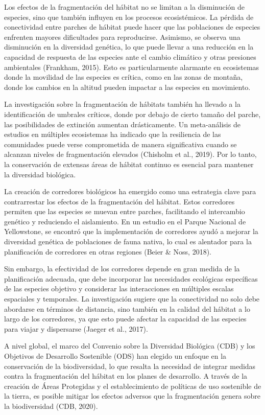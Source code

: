 \documentclass[
  letterpaper,
  DIV=11,
  numbers=noendperiod,
  oneside]{scrreprt}
\begin{document}
Los efectos de la fragmentación del hábitat no se limitan a la
disminución de especies, sino que también influyen en los procesos
ecosistémicos. La pérdida de conectividad entre parches de hábitat puede
hacer que las poblaciones de especies enfrenten mayores dificultades
para reproducirse. Asimismo, se observa una disminución en la diversidad
genética, lo que puede llevar a una reducción en la capacidad de
respuesta de las especies ante el cambio climático y otras presiones
ambientales (Frankham, 2015). Esto es particularmente alarmante en
ecosistemas donde la movilidad de las especies es crítica, como en las
zonas de montaña, donde los cambios en la altitud pueden impactar a las
especies en movimiento.

La investigación sobre la fragmentación de hábitats también ha llevado a
la identificación de umbrales críticos, donde por debajo de cierto
tamaño del parche, las posibilidades de extinción aumentan
drásticamente. Un meta-análisis de estudios en múltiples ecosistemas ha
indicado que la resiliencia de las comunidades puede verse comprometida
de manera significativa cuando se alcanzan niveles de fragmentación
elevados (Chisholm et al., 2019). Por lo tanto, la conservación de
extensas áreas de hábitat continuo es esencial para mantener la
diversidad biológica.

La creación de corredores biológicos ha emergido como una estrategia
clave para contrarrestar los efectos de la fragmentación del hábitat.
Estos corredores permiten que las especies se muevan entre parches,
facilitando el intercambio genético y reduciendo el aislamiento. En un
estudio en el Parque Nacional de Yellowstone, se encontró que la
implementación de corredores ayudó a mejorar la diversidad genética de
poblaciones de fauna nativa, lo cual es alentador para la planificación
de corredores en otras regiones (Beier \& Noss, 2018).

Sin embargo, la efectividad de los corredores depende en gran medida de
la planificación adecuada, que debe incorporar las necesidades
ecológicas específicas de las especies objetivo y considerar las
interacciones en múltiples escalas espaciales y temporales. La
investigación sugiere que la conectividad no solo debe abordarse en
términos de distancia, sino también en la calidad del hábitat a lo largo
de los corredores, ya que esto puede afectar la capacidad de las
especies para viajar y dispersarse (Jaeger et al., 2017).

A nivel global, el marco del Convenio sobre la Diversidad Biológica
(CDB) y los Objetivos de Desarrollo Sostenible (ODS) han elegido un
enfoque en la conservación de la biodiversidad, lo que resalta la
necesidad de integrar medidas contra la fragmentación del hábitat en los
planes de desarrollo. A través de la creación de Áreas Protegidas y el
establecimiento de políticas de uso sostenible de la tierra, es posible
mitigar los efectos adversos que la fragmentación genera sobre la
biodiversidad (CDB, 2020).
\end{document}
